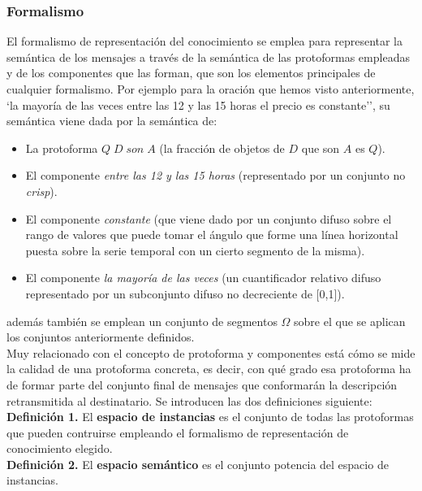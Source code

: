\documentclass[10pt,a4paper]{article}
\begin{document}
\subsubsection{Formalismo}

El formalismo de representación del conocimiento se emplea para representar la semántica de los mensajes a través de la semántica de las protoformas empleadas y de los componentes que las forman, que son los elementos principales de cualquier formalismo. Por ejemplo para la oración que hemos visto anteriormente, `la mayoría de las veces entre las 12 y las 15 horas el precio es constante'', su semántica viene dada por la semántica de:

\begin{itemize}
\item La protoforma $Q \; D \; son \; A$ (la fracción de objetos de $D$ que son $A$ es $Q$).
\item El componente \textit{entre las 12 y las 15 horas} (representado por un conjunto no \textit{crisp}).
\item El componente \textit{constante} (que viene dado por un conjunto difuso sobre el rango de valores que puede tomar el ángulo que forme una línea horizontal puesta sobre la serie temporal con un cierto segmento de la misma).
\item El componente \textit{la mayoría de las veces} (un cuantificador relativo difuso representado por un subconjunto difuso no decreciente de [0,1]).
\end{itemize}

además también se emplean un conjunto de segmentos $\Omega$ sobre el que se aplican los conjuntos anteriormente definidos.\\

Muy relacionado con el concepto de protoforma y componentes está cómo se mide la calidad de una protoforma concreta, es decir, con qué grado esa protoforma ha de formar parte del conjunto final de mensajes que conformarán la descripción retransmitida al destinatario. Se introducen las dos definiciones siguiente:\\

\textbf{Definición 1.} El \textbf{espacio de instancias} es el conjunto de todas las protoformas que pueden contruirse empleando el formalismo de representación de conocimiento elegido.\\

\textbf{Definición 2.} El \textbf{espacio semántico} es el conjunto potencia del espacio de instancias.
\end{document}
